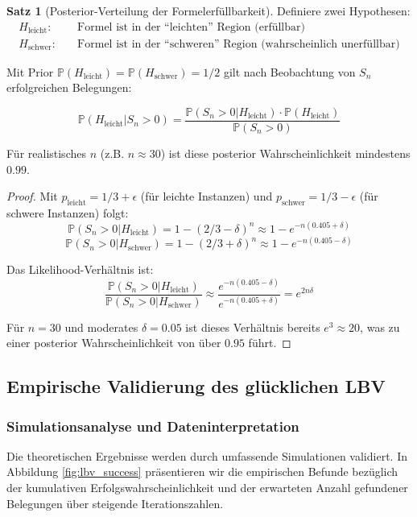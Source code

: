 ﻿\documentclass[a4paper,12pt]{article}
\theoremstyle{definition}
\newtheorem{satz}{Satz}
\begin{document}
\begin{satz}[Posterior-Verteilung der Formelerfüllbarkeit]
Definiere zwei Hypothesen:
\begin{align}
H_{\text{leicht}}: & \quad \text{Formel ist in der ``leichten'' Region (erfüllbar)} \\
H_{\text{schwer}}: & \quad \text{Formel ist in der ``schweren'' Region (wahrscheinlich unerfüllbar)}
\end{align}

Mit Prior $\mathbb{P}(H_{\text{leicht}}) = \mathbb{P}(H_{\text{schwer}}) = 1/2$ gilt nach Beobachtung von $S_n$ erfolgreichen Belegungen:

\[
\mathbb{P}(H_{\text{leicht}} | S_n > 0) = \frac{\mathbb{P}(S_n > 0 | H_{\text{leicht}}) \cdot \mathbb{P}(H_{\text{leicht}})}{\mathbb{P}(S_n > 0)}
\]

Für realistisches $n$ (z.B. $n \approx 30$) ist diese posterior Wahrscheinlichkeit mindestens $0.99$.
\end{satz}

\begin{proof}
Mit $p_{\text{leicht}} = 1/3 + \epsilon$ (für leichte Instanzen) und $p_{\text{schwer}} = 1/3 - \epsilon$ (für schwere Instanzen) folgt:
\[
\mathbb{P}(S_n > 0 | H_{\text{leicht}}) = 1 - (2/3 - \delta)^n \approx 1 - e^{-n(0.405 + \delta)}
\]
\[
\mathbb{P}(S_n > 0 | H_{\text{schwer}}) = 1 - (2/3 + \delta)^n \approx 1 - e^{-n(0.405 - \delta)}
\]

Das Likelihood-Verhältnis ist:
\[
\frac{\mathbb{P}(S_n > 0 | H_{\text{leicht}})}{\mathbb{P}(S_n > 0 | H_{\text{schwer}})} \approx \frac{e^{-n(0.405-\delta)}}{e^{-n(0.405+\delta)}} = e^{2n\delta}
\]

Für $n = 30$ und moderates $\delta = 0.05$ ist dieses Verhältnis bereits $e^{3} \approx 20$, was zu einer posterior Wahrscheinlichkeit von über $0.95$ führt.
\end{proof}

\subsection{Empirische Validierung des glücklichen LBV}

\subsubsection{Simulationsanalyse und Dateninterpretation}

Die theoretischen Ergebnisse werden durch umfassende Simulationen validiert. In Abbildung \ref{fig:lbv_success} präsentieren wir die empirischen Befunde bezüglich der kumulativen Erfolgswahrscheinlichkeit und der erwarteten Anzahl gefundener Belegungen über steigende Iterationszahlen.
\end{document}
